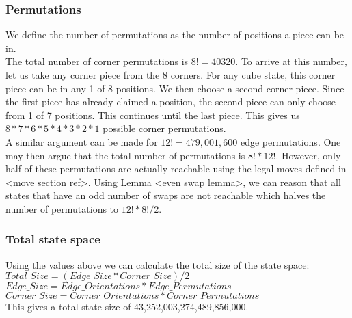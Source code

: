 \documentclass[titlepage]{report}[12pt]
\begin{document}
\subsubsection{Permutations}
We define the number of permutations as the number of positions a piece can be in. 
\\
\indent
The total number of corner permutations is \begin{math}8! = 40320 \end{math}. To arrive at this number, let us take any corner piece from the 8 corners. For any cube state, this corner piece can be in any 1 of 8 positions. We then choose a second corner piece. Since the first piece has already claimed a position, the second piece can only choose from 1 of 7 positions. This continues until the last piece. This gives us \begin{math} 8*7*6*5*4*3*2*1 \end{math} possible corner permutations.
\\
\indent
A similar argument can be made for \begin{math} 12! = 479,001,600 \end{math} edge permutations. One may then argue that the total number of permutations is \begin{math} 8! * 12! \end{math}. However, only half of these permutations are actually reachable using the legal moves defined in <move section ref>. Using Lemma <even swap lemma>, we can reason that all states that have an odd number of swaps are not reachable which halves the number of permutations to \begin{math} 12! * 8! / 2 \end{math}.

\subsubsection{Total state space}
Using the values above we can calculate the total size of the state space:
\\
\begin{math}Total\_Size = (Edge\_Size*Corner\_Size)/2\end{math}
\\
\begin{math}Edge\_Size = Edge\_Orientations * Edge\_Permutations\end{math}
\\
\begin{math}Corner\_Size = Corner\_Orientations * Corner\_Permutations\end{math}
\\
This gives a total state size of 43,252,003,274,489,856,000.
 
\end{document}
